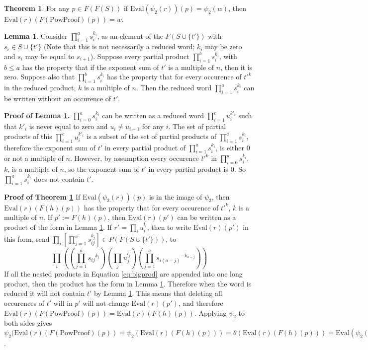 \documentclass[11pt]{article} %
\theoremstyle{definition}
\newtheorem{theorem}{Theorem}[section]
\theoremstyle{definition}
\theoremstyle{definition}
\theoremstyle{definition}
\newtheorem{sublemma}{Lemma}[theorem]
\theoremstyle{definition}
\theoremstyle{definition}
\begin{document}
\begin{theorem}\label{powproof}
  For any $p \in F(F(S))$ if \newline $\text{Eval}(\psi_2(r))(p) = \psi_2(w)$,
  then $\text{Eval}(r)(F(\text{PowProof})(p)) = w$.
\end{theorem}

\begin{sublemma}\label{powproof1}
  Consider $\prod_{i = 1}^a s_i^{k_i}$, as an element of the $F(S \cup \{t'\})$
  with $s_i \in S \cup \{t'\}$ (Note that this is not necessarily a reduced
  word; $k_i$ may be zero and $s_i$ may be equal to $s_{i+1}$).
  Suppose every partial product $\prod_{i=1}^b s_i^{k_i}$,
  with $b \le a$ has the property that if the exponent sum of $t'$ is a multiple
  of $n$, then it is zero. Suppose also that $\prod_{i = 1}^b s_i^{k_i}$ has the
  property that for every occurence of $t'^k$ in the reduced product, $k$ is a multiple of
  $n$. Then the reduced word $\prod_{i = 1}^a s_i^{k_i}$
  can be written without an occurence of $t'$.
\end{sublemma}

\textbf{Proof of Lemma \ref{powproof1}.} $\prod_{i=0}^a s_i^{k_i}$ can be written as a reduced
word $\prod_{i = 1}^{c} u_i^{k'_i}$ such that $k'_i$ is never equal to zero and
$u_i \ne u_{i+1}$ for any $i$. The set of partial products of this
$\prod_{i = 1}^{c} u_i^{k'_i}$ is a subset of the set of partial products of $\prod_{i=1}^a s_i^{k_i}$,
therefore the exponent sum of $t'$ in every partial product of $\prod_{i=1}^a s_i^{k_i}$, is
either $0$ or not a multiple of $n$. However, by assumption every occurence $t'^k$ in
$\prod_{i=0}^a s_i^{k_i}$, $k$, is a multiple of $n$, so the exponent sum of $t'$ in every
partial product is $0$. So $\prod_{i=1}^a s_i^{k_i}$ does not contain $t'$.

\textbf{Proof of Theorem \ref{powproof}} \newline
If $\text{Eval}(\psi_2(r))(p)$ is in the image of $\psi_2$, then
$\text{Eval}(r)(F(h)(p))$ has the property
that for every occurence of $t'^k$, $k$ is a multiple of $n$.
If $p' := F(h)(p)$,
then $\text{Eval}(r)(p')$ can be written as a product of the form in
Lemma \ref{powproof1}.
If $r' = \prod_i u_i^{l_i}$, then to write $\text{Eval}(r)(p')$ in this
form, send $\prod_i \left[\prod_{j = 1}^a s_{ij}^{k_j}\right]
\in P(F(S \cup \{t'\}))$, to
\begin{equation} \label{eq:bigprod}
  \prod_i \left(\left(\prod_{j = 1}^a {s_{ij}}^{k_j}\right) \left(\prod_j u_j^{l_j}\right)
  \left(\prod_{j = 1}^a {s_{i(a - j)}}^{-k_{a - j}}\right)\right)
\end{equation}
If all the nested products in Equation \ref{eq:bigprod} are appended into one long product,
then the product has the form in Lemma \ref{powproof1}. Therefore when the word is reduced
it will not contain $t'$ by Lemma \ref{powproof1}. This means that deleting all occurences of
$t'$ will in $p'$ will not change $\text{Eval}(r)(p')$, and therefore
$\text{Eval}(r)(F(\text{PowProof})(p)) = \text{Eval}(r)(F(h)(p))$.
Applying $\psi_2$ to both sides gives
$\psi_2(\text{Eval}(r)(F(\text{PowProof})(p)) =
  \psi_2(\text{Eval}(r)(F(h)(p))) =
  \theta(\text{Eval}(r)(F(h)(p))) =
  \text{Eval}(\psi_2(r))(p)$.
\end{document}
